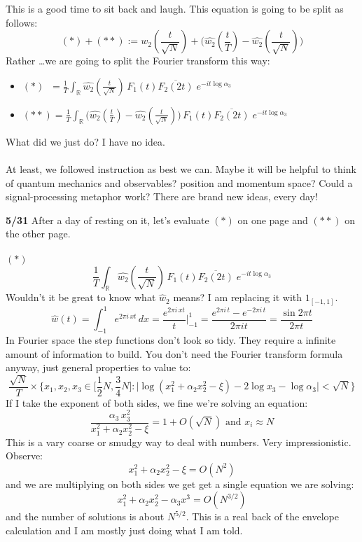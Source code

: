 \documentclass[12pt]{article}
\begin{document}
This is a good time to sit back and laugh.  This equation is going to be split as follows:
$$ (\ast) + (\ast \ast) := \widehat{w_2}(\frac{t}{\sqrt{N}})  + \big( \widehat{w_2}(\frac{t}{T})  - \widehat{w_2}(\frac{t}{\sqrt{N}}) \big) $$
Rather \dots we are going to split the Fourier transform this way:
\begin{itemize}
\item $(\ast) \;\;= \frac{1}{T} \int_\mathbb{R} \widehat{w_2}(\frac{t}{\sqrt{N}}) \, F_1(t) \overline{F_2(2t)} \;e^{-it \log \alpha_3}$
\item $(\ast \ast) = \frac{1}{T} \int_\mathbb{R} 
\Big(\widehat{w_2}(\frac{t}{T}) - \widehat{w_2}(\frac{t}{\sqrt{N}}) \Big)
 \, F_1(t) \overline{F_2(2t)}\;e^{-it \log \alpha_3}$
\end{itemize}
What did we just do?  I have no idea.  \\ \\
At least, we followed instruction as best we can.  Maybe it will be helpful to think of quantum mechanics and observables?  position and momentum space?  Could a signal-processing metaphor work?  There are brand new ideas, every day!

\newpage

\noindent \textbf{5/31} After a day of resting on it, let's evaluate $(\ast)$ on one page and $(\ast \ast)$ on the other page. \\ \\
$(\ast)$ 
$$ \frac{1}{T} \int_\mathbb{R} \widehat{w_2}(\frac{t}{\sqrt{N}}) \, F_1(t) \overline{F_2(2t)} \;e^{-it \log \alpha_3}$$ 
Wouldn't it be great to know what $\widehat{w}_2$ means?  I am replacing it with $1_{[-1,1]}$.
$$ \widehat{w}(t)  = \int_{-1}^1 e^{2\pi i \, x t} \, dx = \frac{e^{2\pi i \, x t}}{t}\bigg|_{-1}^1 = \frac{e^{2\pi i \, t} - e^{-2\pi i \, t}}{2\pi i t} = \frac{\sin 2\pi t}{2\pi t}$$
In Fourier space the step functions don't look so tidy.  They require a infinite amount of information to build.  You don't need the Fourier transform formula anyway, just general properties to value to:
$$ \frac{\sqrt{N}}{T} \times \bigg\{ x_1, x_2, x_3 \in \big[\frac{1}{2}N, \frac{3}{4}N \big] : \Big| \log(x_1^2 + \alpha_2 x_2^2 - \xi) - 2 \log x_3 - \log \alpha_3 \Big| < \sqrt{N} \bigg\}   $$
If I take the exponent of both sides, we fine we're solving an equation:
$$  \frac{\alpha_3 \, x_3^2 }{x_1^2 + \alpha_2 x_2^2 - \xi} = 1 + O(\sqrt{N}) \text{ and } x_i \approx N$$
This is a vary coarse or smudgy way to deal with numbers.  Very impressionistic.  Observe:
$$ x_1^2 + \alpha_2 x_2^2 - \xi = O(N^2)$$
and we are multiplying on both sides we get get a single equation we are solving:
$$ x_1^2 + \alpha_2 x_2^2 - \alpha_3 x^3 = O(N^{3/2})$$
and the number of solutions is about $N^{5/2}$. This is a real back of the envelope calculation and I am mostly just doing what I am told.
\end{document}
